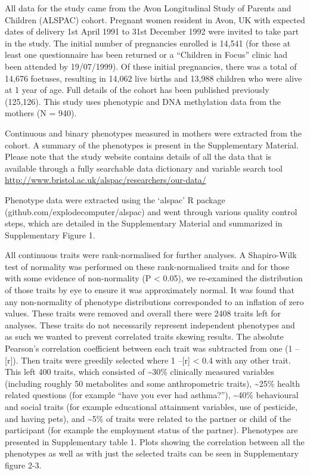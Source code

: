 \documentclass[11pt,oneside]{bristolthesis}
\begin{document}
All data for the study came from the Avon Longitudinal Study of Parents and Children (ALSPAC) cohort. Pregnant women resident in Avon, UK with expected dates of delivery 1st April 1991 to 31st December 1992 were invited to take part in the study. The initial number of pregnancies enrolled is 14,541 (for these at least one questionnaire has been returned or a ``Children in Focus'' clinic had been attended by 19/07/1999). Of these initial pregnancies, there was a total of 14,676 foetuses, resulting in 14,062 live births and 13,988 children who were alive at 1 year of age. Full details of the cohort has been published previously (125,126). This study uses phenotypic and DNA methylation data from the mothers (N = 940).

Continuous and binary phenotypes measured in mothers were extracted from the cohort. A summary of the phenotypes is present in the Supplementary Material. Please note that the study website contains details of all the data that is available through a fully searchable data dictionary and variable search tool \url{http://www.bristol.ac.uk/alspac/researchers/our-data/}

Phenotype data were extracted using the `alspac' R package (github.com/explodecomputer/alspac) and went through various quality control steps, which are detailed in the Supplementary Material and summarized in Supplementary Figure 1.

All continuous traits were rank-normalised for further analyses. A Shapiro-Wilk test of normality was performed on these rank-normalised traits and for those with some evidence of non-normality (P \textless{} 0.05), we re-examined the distribution of those traits by eye to ensure it was approximately normal. It was found that any non-normality of phenotype distributions corresponded to an inflation of zero values. These traits were removed and overall there were 2408 traits left for analyses. These traits do not necessarily represent independent phenotypes and as such we wanted to prevent correlated traits skewing results. The absolute Pearson's correlation coefficient between each trait was subtracted from one (1 --{[}r{]}). Then traits were greedily selected where 1 --{[}r{]} \textless{} 0.4 with any other trait. This left 400 traits, which consisted of \textasciitilde30\% clinically measured variables (including roughly 50 metabolites and some anthropometric traits), \textasciitilde25\% health related questions (for example ``have you ever had asthma?''), \textasciitilde40\% behavioural and social traits (for example educational attainment variables, use of pesticide, and having pets), and \textasciitilde5\% of traits were related to the partner or child of the participant (for example the employment status of the partner). Phenotypes are presented in Supplementary table 1. Plots showing the correlation between all the phenotypes as well as with just the selected traits can be seen in Supplementary figure 2-3.
\end{document}
